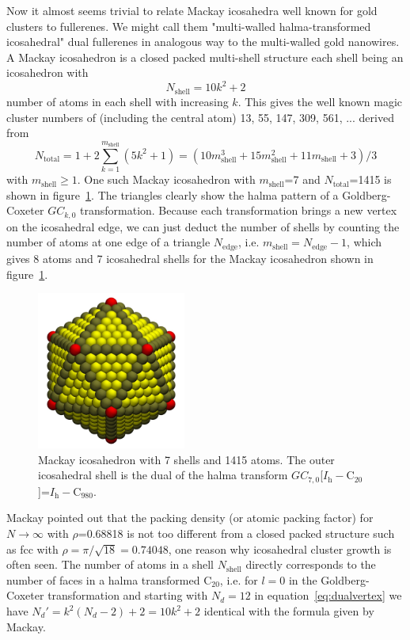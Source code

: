 Now it almost seems trivial to relate Mackay icosahedra\autocite{Mackay-1962}
well known for gold clusters\autocite{Nam2002,Wang-Wang-2011} to fullerenes. We
might call them "multi-walled halma-transformed icosahedral" dual fullerenes in
analogous way to the multi-walled gold nanowires. A Mackay icosahedron is a
closed packed multi-shell structure each shell being an icosahedron with
%
\begin{equation}
  \label{eq:mackay} 
N_\text{shell}=10k^2+2
\end{equation}
%
number of atoms in each shell with increasing $k$. This gives the well known
magic cluster numbers of (including the central atom) 13, 55, 147, 309, 561,
... derived from
%
\begin{equation}
  \label{eq:mackaytotal} 
N_\text{total}=1+2\sum_{k=1}^{m_\text{shell}}\left( 5k^2+1 \right)=(10m_\text{shell}^3+15m_\text{shell}^2+11m_\text{shell}+3)/3
\end{equation}
%
with $m_\text{shell} \ge 1$. One such Mackay icosahedron with $m_\text{shell}$=7 and
$N_\text{total}$=1415 is shown in figure~\ref{fig:mackaylarge}. The triangles
clearly show the halma pattern of a Goldberg-Coxeter $GC_{k,0}$ transformation.
Because each transformation brings a new vertex on the icosahedral edge, we can
just deduct the number of shells by counting the number of atoms at one edge of
a triangle $N_\text{edge}$, i.e. $m_\text{shell}=N_\text{edge}-1$, which gives 8 atoms and 7
icosahedral shells for the Mackay icosahedron shown in figure~\ref{fig:mackaylarge}.
%
\begin{figure}[htb]
\begin{center}
\includegraphics[width=4.9cm]{golddual/ico.jpg}
    \caption{Mackay icosahedron with 7 shells and 1415 atoms. The outer icosahedral shell is the dual of the halma transform $GC_{7,0}$[$I_\mathrm{h}-$C$_{20}$]=$I_\mathrm{h}-$C$_{980}$.}
\label{fig:mackaylarge}
\end{center}
\end{figure}
%
Mackay pointed out that the packing density (or atomic packing factor) for $N
\rightarrow \infty$ with $\rho$=0.68818 is not too different from a closed
packed structure such as fcc with
$\rho=\pi/\sqrt{18}=0.74048$,\autocite{Mackay-1962} one reason why icosahedral
cluster growth is often seen. The number of atoms in a shell $N_\text{shell}$
directly corresponds to the number of faces in a halma transformed C$_{20}$,
i.e. for $l=0$ in the Goldberg-Coxeter transformation and starting with
$N_d=12$ in equation~\eqref{eq:dualvertex} we have $N_d'=k^2(N_d-2)+2 = 10k^2+2$
identical with the formula given by Mackay. 

